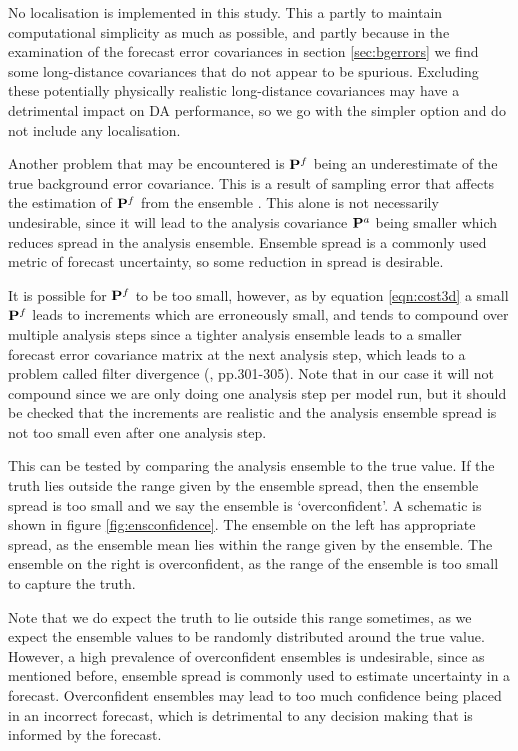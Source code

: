 No localisation is implemented in this study. This a partly to maintain computational simplicity as much as possible, and partly because in the examination of the forecast error covariances in section \ref{sec:bgerrors} we find some long-distance covariances that do not appear to be spurious. Excluding these potentially physically realistic long-distance covariances may have a detrimental impact on DA performance, so we go with the simpler option and do not include any localisation.

Another problem that may be encountered is $\mathbf{P}^f$ being an underestimate of the true background error covariance. This is a result of sampling error that affects the estimation of $\mathbf{P}^f$ from the ensemble \citep{Sacher2008}. This alone is not necessarily undesirable, since it will lead to the analysis covariance $\mathbf{P}^a$ being smaller which reduces spread in the analysis ensemble. Ensemble spread is a commonly used metric of forecast uncertainty, so some reduction in spread is desirable. 

It is possible for $\mathbf{P}^f$ to be too small, however, as by equation \ref{eqn:cost3d} a small $\mathbf{P}^f$ leads to increments which are erroneously small, and tends to compound over multiple analysis steps since a tighter analysis ensemble leads to a smaller forecast error covariance matrix at the next analysis step, which leads to a problem called filter divergence (\citet{Jazwinski1970}, pp.301-305). Note that in our case it will not compound since we are only doing one analysis step per model run, but it should be checked that the increments are realistic and the analysis ensemble spread is not too small even after one analysis step.

This can be tested by comparing the analysis ensemble to the true value. If the truth lies outside the range given by the ensemble spread, then the ensemble spread is too small and we say the ensemble is `overconfident'. A schematic is shown in figure \ref{fig:ensconfidence}. The ensemble on the left has appropriate spread, as the ensemble mean lies within the range given by the ensemble. The ensemble on the right is overconfident, as the range of the ensemble is too small to capture the truth.

Note that we do expect the truth to lie outside this range sometimes, as we expect the ensemble values to be randomly distributed around the true value. However, a high prevalence of overconfident ensembles is undesirable, since as mentioned before, ensemble spread is commonly used to estimate uncertainty in a forecast. Overconfident ensembles may lead to too much confidence being placed in an incorrect forecast, which is detrimental to any decision making that is informed by the forecast.

